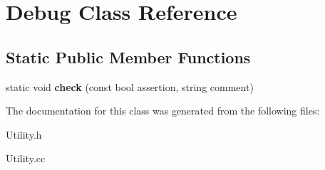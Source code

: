 \hypertarget{classDebug}{\section{Debug Class Reference}
\label{classDebug}
}
\subsection*{Static Public Member Functions}
\begin{DoxyCompactItemize}
\item 
\hypertarget{classDebug_a288d30d4e80bd710845b7b809a675eab}{static void {\bfseries check} (const bool assertion, string comment)}\label{classDebug_a288d30d4e80bd710845b7b809a675eab}

\end{DoxyCompactItemize}


The documentation for this class was generated from the following files\-:\begin{DoxyCompactItemize}
\item 
Utility.\-h\item 
Utility.\-cc\end{DoxyCompactItemize}
